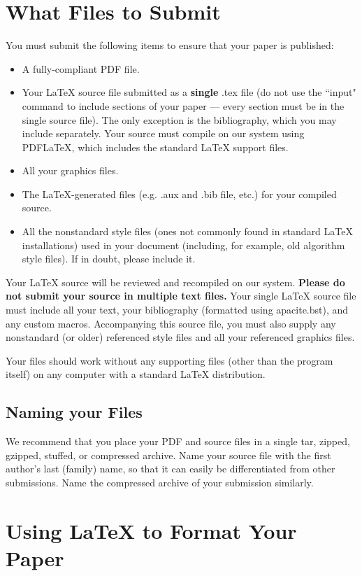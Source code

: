 \documentclass[letterpaper]{article}
\begin{document}
\section{What Files to Submit}
You must submit the following items to ensure that your paper is published:
\begin{itemize}
\item A fully-compliant PDF file.
\item Your  \LaTeX{}  source file submitted as a \textbf{single} .tex file (do not use the ``input" command to include sections of your paper --- every section must be in the single source file). The only exception is the bibliography, which you may include separately. Your source must compile on our system using PDF\LaTeX{}, which includes the standard \LaTeX{} support files.
\item All your graphics files.
\item The \LaTeX{}-generated files (e.g. .aux and .bib file, etc.) for your compiled source.
\item All the nonstandard style files (ones not commonly found in standard \LaTeX{} installations) used in your document (including, for example, old algorithm style files). If in doubt, please include it.
\end{itemize}

Your \LaTeX{} source will be reviewed and recompiled on our system.   \textbf{Please do not submit your source in multiple text files.} Your single \LaTeX{} source file must include all your text, your bibliography (formatted using apacite.bst), and any custom macros. Accompanying this source file, you must also supply any nonstandard (or older) referenced style files and all your referenced graphics files. 

Your files should work without any supporting files (other than the program itself) on any computer with a standard \LaTeX{} distribution. 

\subsection{Naming your Files}

We recommend that you place your PDF and source files in a single tar, zipped, gzipped, stuffed, or compressed archive. Name your source file with the first author's last (family) name, so that it can easily be differentiated from other submissions.  Name the compressed archive of your submission similarly.


\section{Using \LaTeX{} to Format Your Paper}
\end{document}
